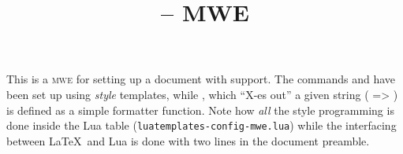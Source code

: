 \documentclass{article}
\title{\package{luatemplates} -- MWE}
\begin{document}
\maketitle

This is a \textsc{mwe} for setting up a document with 
support.  The commands  and  have been set up using
\emph{style} templates, while , which “X-es out” a given string
( => ) is defined as a simple formatter
function.  Note how \emph{all} the style programming is done inside the Lua
table (\texttt{luatemplates-config-mwe.lua}) while the interfacing between
\LaTeX\ and Lua is done with two lines in the document preamble.
\end{document}
